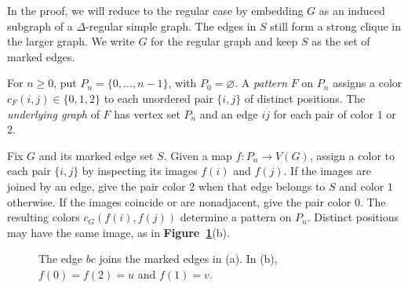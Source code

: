 \documentclass[preprint,11pt,numbers]{elsarticle-arxiv}
\numberwithin{equation}{section}
\theoremstyle{definition}
\begin{document}
In the proof, we will reduce to the regular case by embedding $G$
as an induced subgraph of a $\Delta$-regular simple graph. The edges
in $S$ still form a strong clique in the larger graph. We write $G$
for the regular graph and keep $S$ as the set of marked edges.

For $n\geq0$, put $P_n=\{0,\ldots,n-1\}$, with $P_0=\varnothing$.
A \emph{pattern} $F$ on $P_n$ assigns a color $c_F(i,j)\in\{0,1,2\}$
to each unordered pair
$\{i,j\}$ of distinct positions. The \emph{underlying graph} of $F$
has vertex set $P_n$ and an edge $ij$ for each pair of color $1$ or $2$.

Fix $G$ and its marked edge set $S$. Given a map $f\colon P_n\to V(G)$,
assign a color to each pair $\{i,j\}$ by inspecting its images
$f(i)$ and $f(j)$. If the images are joined by an edge, give the pair
color $2$ when that edge belongs to $S$ and color $1$ otherwise.
If the images coincide or are nonadjacent, give the pair color $0$.
The resulting colors $c_G(f(i),f(j))$ determine a pattern on $P_n$.
Distinct positions may have the same image, as in
\textbf{Figure~\ref{fig:marked-maps}}(b).

\begin{figure}[htbp]
\centering
{}
\caption{The edge $bc$ joins the marked edges in (a).
In (b), $f(0)=f(2)=u$ and $f(1)=v$.}
\label{fig:marked-maps}
\end{figure}
\end{document}
